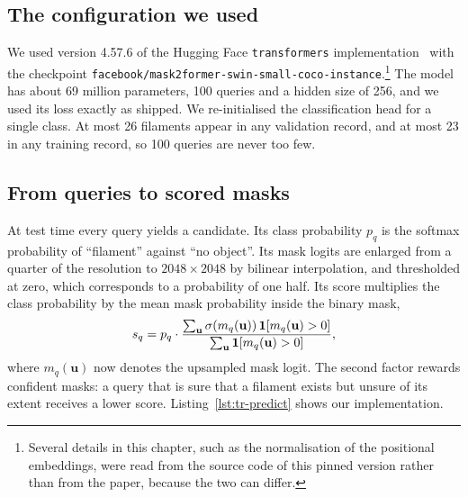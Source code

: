 \subsection{The configuration we used}\label{sec:tr-config}
We used version 4.57.6 of the Hugging Face \texttt{transformers} implementation~\citep{wolf2020} with the checkpoint
\texttt{facebook/\allowbreak mask2former-\allowbreak swin-\allowbreak small-\allowbreak coco-\allowbreak instance}.\footnote{Several details in this chapter, such
as the normalisation of the positional embeddings, were read from the source code of this pinned
version rather than from the paper, because the two can differ.} The model has about 69 million
parameters,
100 queries and a hidden size of 256, and we used its loss exactly as shipped. We re-initialised the
classification head for a single class. At most 26 filaments appear in any validation record, and at
most 23 in any training record, so 100 queries are never too few.

\subsection{From queries to scored masks}\label{sec:tr-inference}
At test time every query yields a candidate. Its class probability $p_q$ is the softmax probability of
``filament'' against ``no object''. Its mask logits are enlarged from a quarter of the resolution to
$2048\times2048$ by bilinear interpolation, and thresholded at zero, which corresponds to a probability
of one half. Its score multiplies the class probability by the mean mask probability inside the binary
mask,
\begin{equation}
s_q = p_q \cdot \frac{\sum_{\mathbf{u}} \sigma(m_q(\mathbf{u}))\,\mathbf{1}[m_q(\mathbf{u})>0]}
{\sum_{\mathbf{u}} \mathbf{1}[m_q(\mathbf{u})>0]} ,
\label{eq:tr-score}
\end{equation}
where $m_q(\mathbf{u})$ now denotes the upsampled mask logit. The second factor rewards confident
masks: a query that is sure that a filament exists but unsure of its extent receives a lower score.
Listing~\ref{lst:tr-predict} shows our implementation.

